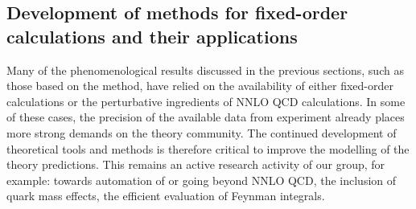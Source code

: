 \documentclass{FBR_Bericht_2025}
\begin{document}
\subsection{Development of methods for fixed-order calculations and their applications}
\begin{refsection}

Many of the phenomenological results discussed in the previous sections, such as those based on the \minnlo{} method, have relied on the availability of either fixed-order calculations or the perturbative ingredients of NNLO QCD calculations.
%
In some of these cases, the precision of the available data from experiment already places more strong demands on the theory community.
%
The continued development of theoretical tools and methods is therefore critical to improve the modelling of the theory predictions. This remains an active research activity of our group, for example: towards automation of or going beyond NNLO QCD, the inclusion of quark mass effects, the efficient evaluation of Feynman integrals.


\end{refsection}
\end{document}
